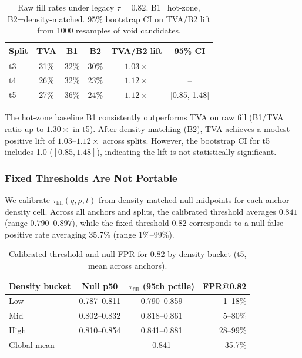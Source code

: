 \documentclass[sigconf]{acmart}
\newcommand{\tva}{\textsf{TVA}}
\newcommand{\taufill}{\tau_{\mathrm{fill}}}
\begin{document}
\begin{table}[h]
\centering
\caption{Raw fill rates under legacy $\tau=0.82$. B1=hot-zone, B2=density-matched.
95\% bootstrap CI on \tva{}/B2 lift from 1000 resamples of void candidates.}
\label{tab:fill_legacy}
\begin{tabular}{lccccc}
\toprule
Split & \tva{} & B1 & B2 & \tva{}/B2 lift & 95\% CI \\
\midrule
t3 & 31\% & 32\% & 30\% & $1.03\times$ & -- \\
t4 & 26\% & 32\% & 23\% & $1.12\times$ & -- \\
t5 & 27\% & 36\% & 24\% & $1.12\times$ & [0.85, 1.48] \\
\bottomrule
\end{tabular}
\end{table}

The hot-zone baseline B1 consistently outperforms \tva{} on raw fill (B1/\tva{} ratio
up to $1.30\times$ in t5).
After density matching (B2), \tva{} achieves a modest positive lift of $1.03$--$1.12\times$
across splits.
However, the bootstrap CI for t5 includes 1.0 ($[0.85, 1.48]$), indicating the lift is
not statistically significant.

\subsubsection{Fixed Thresholds Are Not Portable}
\label{sec:finding1b}

We calibrate $\taufill(q,\rho,t)$ from density-matched null midpoints for each
anchor-density cell.
Across all anchors and splits, the calibrated threshold averages $0.841$ (range $0.790$--$0.897$),
while the fixed threshold $0.82$ corresponds to a null false-positive rate averaging 35.7\%
(range 1\%--99\%).

\begin{table}[h]
\centering
\caption{Calibrated threshold and null FPR for 0.82 by density bucket (t5, mean across anchors).}
\label{tab:calibration}
\begin{tabular}{lccr}
\toprule
Density bucket & Null p50 & $\taufill$ (95th pctile) & FPR@0.82 \\
\midrule
Low  & 0.787--0.811 & 0.790--0.859 & 1--18\% \\
Mid  & 0.802--0.832 & 0.818--0.861 & 5--80\% \\
High & 0.810--0.854 & 0.841--0.881 & 28--99\% \\
Global mean & -- & 0.841 & 35.7\% \\
\bottomrule
\end{tabular}
\end{table}
\end{document}
